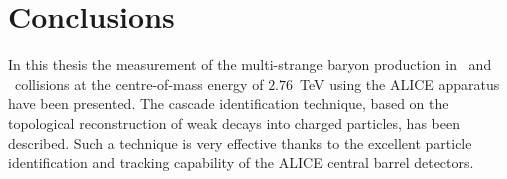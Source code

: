 \clearpage
{}
\chapter*{Conclusions}

In this thesis the measurement of the multi-strange baryon production in \PbPb\ and \pp\ collisions at the centre-of-mass energy of \mbox{$2.76$ TeV} using the \mbox{ALICE} apparatus have been presented. The cascade identification technique, based on the topological reconstruction of weak decays into charged particles, has been described. Such a technique is very effective thanks to the excellent particle identification and tracking capability of the ALICE central barrel detectors.


\newpage
\clearpage



